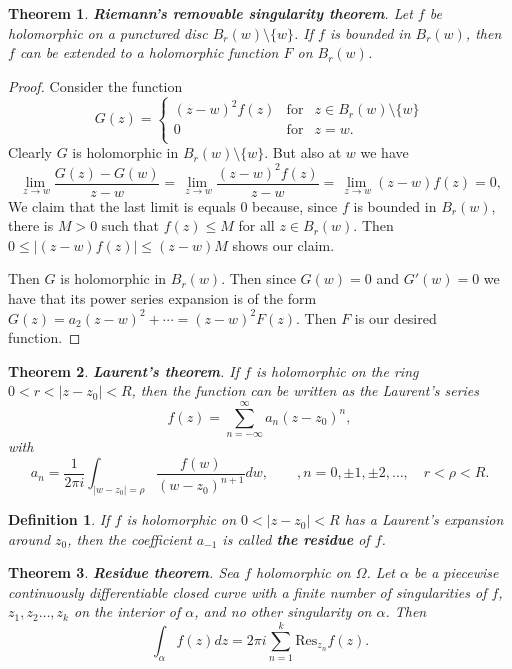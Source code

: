 \documentclass{amsart}
\newtheorem{thm}{Theorem}
\newtheorem{mydef}{Definition}
\begin{document}
\begin{thm}
\textbf{Riemann's removable singularity theorem}. Let \(f\) be holomorphic on a punctured disc \(B_r(w) \setminus \{w\}\). If \(f\) is bounded in \(B_r(w)\), then \(f\) can be extended to a holomorphic function \(F\) on \(B_r(w)\).
\end{thm}
\begin{proof}
Consider the function
\[ G(z) = \left\{ \begin{array}{ccc}
(z-w)^2 f(z) & \mbox{for} & z \in B_r(w)\setminus\{w\} \\
0 & \mbox{for} & z = w. \\
\end{array} \right. \]
Clearly \(G\) is holomorphic in \(B_r(w)\setminus\{w\}\). But also at \(w\) we have
\[ \lim_{\ z \to w} \frac{ G(z) - G(w)}{z-w} = \lim_{\ z \to w} \frac{(z-w)^2 f(z)}{z-w} = \lim_{\ z \to w} (z-w)f(z) = 0, \]
We claim that the last limit is equals \(0\) because, since \(f\) is bounded in \(B_r(w)\), there is \(M>0\) such that \(f(z) \leq M\) for all \(z\in B_r(w)\). 
Then \(0 \leq |(z-w)f(z)| \leq (z-w)M\) shows our claim.

Then \(G\) is holomorphic in \(B_r(w)\). Then since \(G(w) = 0\) and \(G'(w) = 0\) we have that its power series expansion is of the form \(G(z) = a_2 (z-w)^2 + \cdots = (z-w)^2 F(z)\).
Then \(F\) is our desired function.
\end{proof}


\begin{thm}
\textbf{Laurent's theorem}. If \(f\) is holomorphic on the ring \(0 < r < |z - z_0| < R\), then the function can be written as the Laurent's series
\[ f(z) = \sum_{n = -\infty}^{\infty} a_n (z - z_0) ^n ,\]
with
\[ a_n = \frac{1}{2\pi i} \int_{|w - z_0| = \rho}\frac{f(w)}{(w - z_0)^{n+1}} dw, \qquad, n = 0, \pm 1, \pm 2, \ldots, \quad r < \rho < R. \]
\end{thm}


\begin{mydef}
If \(f\) is holomorphic on \(0<|z - z_0| < R\) has a Laurent's expansion around \(z_0\), then the coefficient \(a_{-1}\) is called \textbf{the residue} of \(f\).
\end{mydef}


\begin{thm}
\textbf{Residue theorem}. Sea \(f\) holomorphic on \(\Omega\). Let \(\alpha\) be a piecewise continuously differentiable closed curve with a finite number of singularities of \(f\), \(z_1, z_2 \ldots, z_k\)
on the interior of \(\alpha\), and no other singularity on \(\alpha\). Then
\[ \int_{\alpha}f(z) dz = 2\pi i \sum_{n=1}^k \mbox{Res}_{z_n}f(z). \]
\end{thm}
\end{document}
